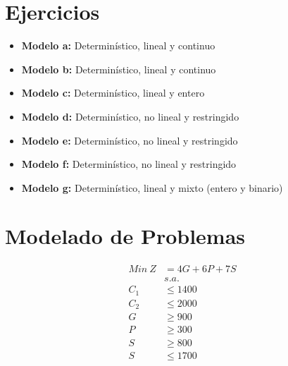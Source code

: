 \documentclass{tarea}
\begin{document}
\caratula
\tableofcontents
\pagebreak

\section{Ejercicios}
\begin{homeworkProblem}

\begin{itemize}
\item {\bfseries Modelo a: }Determinístico, lineal y continuo
\item {\bfseries Modelo b: }Determinístico, lineal y continuo
\item {\bfseries Modelo c: }Determinístico, lineal y entero
\item {\bfseries Modelo d: }Determinístico, no lineal y restringido
\item {\bfseries Modelo e: }Determinístico, no lineal y restringido
\item {\bfseries Modelo f: }Determinístico, no lineal y restringido
\item {\bfseries Modelo g: }Determinístico, lineal y mixto (entero y binario)
\end{itemize}
\end{homeworkProblem}
\pagebreak

\section{Modelado de Problemas}
\begin{homeworkProblem}
\begin{align*}
Min\ Z &	= 4G + 6P + 7S \\
&s.a. \\
C_1 &\le 1400 \\
C_2 &\le 2000 \\
G &\ge 900 \\
P &\ge 300 \\
S &\ge 800 \\
S &\le 1700 \\
\end{align*}
\end{homeworkProblem}
\end{document}

